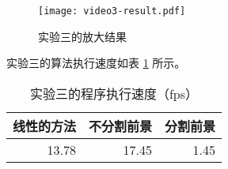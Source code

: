 
\begin{figure}[htbp]
  \centering
  \texttt{[image: video3-result.pdf]}
  \caption{实验三的放大结果}
  \label{fig:exam3-result}
\end{figure}

实验三的算法执行速度如表 \ref{tab:time3} 所示。

\begin{table}[htbp]
  \centering
  \caption{实验三的程序执行速度（fps）}
  \label{tab:time3}
  \begin{tabular}[c]{rrr}
    \toprule[1.5pt]
    线性的方法 & 不分割前景 & 分割前景 \\
    \midrule
    13.78 & 17.45 & 1.45 \\
    \bottomrule[1.5pt]
  \end{tabular}
\end{table}

